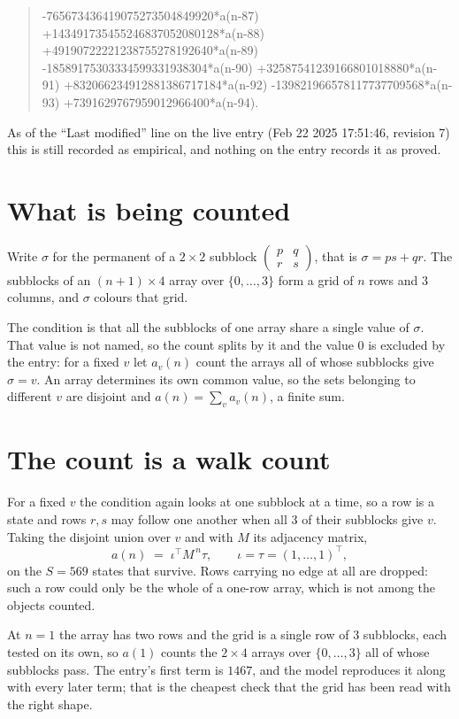 \documentclass[11pt,a4paper]{article}
\theoremstyle{plain}
\theoremstyle{definition}
\begin{document}
\begin{quote}
-765673436419075273504849920*a(n-87) +143491735455246837052080128*a(n-88) +49190722221238755278192640*a(n-89) -18589175303334599331938304*a(n-90) +32587541239166801018880*a(n-91) +832066234912881386717184*a(n-92) -139821966578117737709568*a(n-93) +7391629767959012966400*a(n-94).
\end{quote}
As of the ``Last modified'' line on the live entry (Feb 22 2025 17:51:46, revision 7) this is still
recorded as empirical, and nothing on the entry records it as proved.

\section{What is being counted}

Write $\sigma$ for the permanent of a $2\times2$ subblock
$\begin{pmatrix}p&q\\r&s\end{pmatrix}$, that is $\sigma=ps+qr$. The subblocks of an
$(n+1)\times4$ array over $\{0,\dots,3\}$ form a grid of $n$ rows and $3$
columns, and $\sigma$ colours that grid.

The condition is that all the subblocks of one array share a single value of $\sigma$. That
value is not named, so the count splits by it and the value $0$ is excluded by the entry: for a fixed $v$ let $a_v(n)$ count the
arrays all of whose subblocks give $\sigma=v$. An array determines its own common value, so
the sets belonging to different $v$ are disjoint and $a(n)=\sum_v a_v(n)$, a finite sum.

\section{The count is a walk count}

For a fixed $v$ the condition again looks at one subblock at a time, so a
row is a state and rows $r,s$ may follow one another when all $3$ of their subblocks give
$v$. Taking the disjoint union over $v$ and with $M$ its adjacency matrix,
\[
a(n)\;=\;\iota^{\!\top}M^{\,n}\tau,\qquad\iota=\tau=(1,\dots,1)^{\!\top},
\]
on the $S=569$ states that survive. Rows carrying no edge at all are dropped: such a row could
only be the whole of a one-row array, which is not among the objects counted.

At $n=1$ the array has two rows and the grid is a single row of $3$
subblocks, each tested on its own, so $a(1)$ counts the
$2\times4$ arrays over $\{0,\dots,3\}$ all of whose subblocks pass. The entry's
first term is $1467$, and the model reproduces it along with every later term; that is the
cheapest check that the grid has been read with the right shape.
\end{document}
